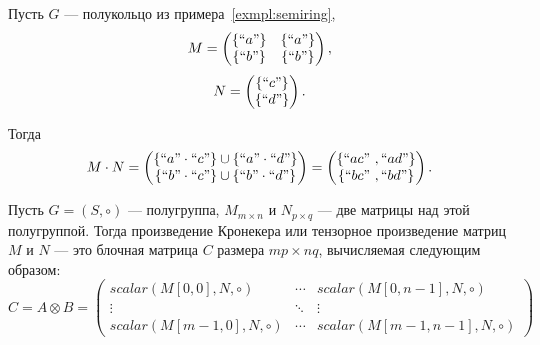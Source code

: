 \begin{example}
Пусть $G$ --- полукольцо из примера~\ref{exmpl:semiring},
$$ M =
\begin{pmatrix}
\{``a"\} & \{``a"\}\\
\{``b"\} & \{``b"\}\\
\end{pmatrix},
$$
$$ N =
\begin{pmatrix}
\{``c"\} \\
\{``d"\} \\
\end{pmatrix}.
$$

Тогда
$$
M \cdot N = 
\begin{pmatrix}
\{``a" \cdot ``c"\} \cup \{``a" \cdot ``d"\} \\
\{``b" \cdot ``c"\} \cup \{``b" \cdot ``d"\}
\end{pmatrix}=
\begin{pmatrix}
\{``ac" \ ,  ``ad"\} \\
\{``bc" \ , ``bd"\}
\end{pmatrix}.
$$

\end{example}


\begin{definition}
Пусть $G = (S,\circ)$ --- полугруппа, $M_{m\times n}$ и $N_{p\times q}$ --- две матрицы над этой полугруппой.
Тогда произведение Кронекера или тензорное произведение матриц $M$ и $N$ --- это блочная матрица $C$ размера $mp \times nq$, вычисляемая следующим образом:
$$
C = A \otimes B = 
\begin{pmatrix}
scalar(M[0,0],N,\circ)   & \cdots & scalar(M[0,n-1],N,\circ)   \\
\vdots                   & \ddots & \vdots       \\
scalar(M[m-1,0],N,\circ) & \cdots & scalar(M[m-1,n-1],N,\circ)
\end{pmatrix}
$$

\end{definition}

\newcommand{\examplemtrx}
{
\begin{pmatrix}
5 & 6 & 7 & 8 \\
9 & 10 & 11 & 12 \\
13 & 14 & 15 & 16 
\end{pmatrix}
}

